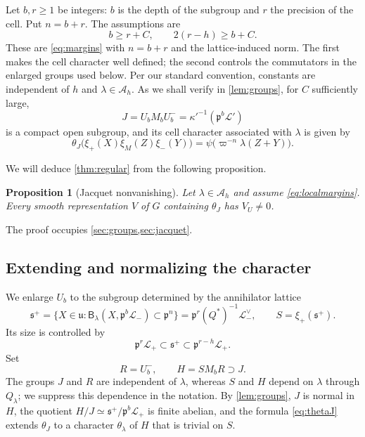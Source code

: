 \documentclass[11pt,reqno]{amsart}
\numberwithin{equation}{section}
\theoremstyle{plain}
\newtheorem{proposition}[theorem]{Proposition}
\theoremstyle{definition}
\theoremstyle{remark}
\theoremstyle{plain}
\newcommand{\pp}{\mathfrak{p}}   %
\newcommand{\Lat}{\mathcal{L}}   %
\newcommand{\g}{\mathfrak{g}}    %
\newcommand{\uu}{\mathfrak{u}}   %
\newcommand{\sS}{\mathfrak{s}^+}   %
\newcommand{\lf}{\lambda}
\newcommand{\Bf}{\mathsf{B}}
\begin{document}
Let $b,r\ge1$ be integers: $b$ is the depth of the
subgroup and $r$ the precision of the cell. Put $n=b+r$. The assumptions are
\begin{equation}\label{eq:localmargins}
b\ge r+C,\qquad 2(r-h)\ge b+C.
\end{equation}
These are \eqref{eq:margins} with $n=b+r$ and the lattice-induced norm.
The first makes the cell character well defined; the second controls the commutators in the
enlarged groups used below. Per our standard convention, constants are independent of $h$ and $\lf\in\mathcal A_h$.
As we shall verify in \cref{lem:groups}, for $C$ sufficiently large,
\[
J=U_bM_bU^-_b=\kappa'^{-1}(\pp^b\Lat')
\]
is a compact open subgroup, and its cell character associated with $\lf$ is given by
\begin{equation}\label{eq:thetaJ}
\theta_J\bigl(\xi_+(X)\xi_M(Z)\xi_-(Y)\bigr)=\psi\bigl(\varpi^{-n}\lf(Z+Y)\bigr).
\end{equation}

We will deduce \cref{thm:regular} from the following proposition.

\begin{proposition}[Jacquet nonvanishing]\label{prop:local}
Let $\lf\in\mathcal A_h$ and assume \eqref{eq:localmargins}.
Every smooth representation $V$ of $G$ containing $\theta_J$ has $V_U\ne0$.
\end{proposition}

The proof occupies \cref{sec:groups,sec:jacquet}.

\subsection{Extending and normalizing the character}\label{sec:groups}
We enlarge $U_b$ to the subgroup determined by the annihilator lattice
\begin{equation}\label{eq:Slattice}
\sS=\{X\in\uu:\Bf_\lf(X,\pp^b\Lat_-)
\subset\pp^n\}
=\pp^r(Q^*)^{-1}\Lat_-^\vee,\qquad S=\xi_+(\sS).
\end{equation}
Its size is controlled by
\[
\pp^r\Lat_+\subset\sS\subset\pp^{r-h}\Lat_+.
\]
Set
\begin{equation}\label{eq:JH}
R=U^-_b,\qquad H=SM_bR\supset J.
\end{equation}
The groups $J$ and $R$ are independent of $\lf$, whereas $S$ and $H$
depend on $\lf$ through $Q_\lf$; we suppress this dependence in the notation.
By \cref{lem:groups}, $J$ is normal in $H$, the quotient
$H/J\simeq\sS/\pp^b\Lat_+$ is finite abelian, and the formula
\eqref{eq:thetaJ} extends $\theta_J$ to a character $\theta_\lf$ of
$H$ that is trivial on $S$.
\end{document}
